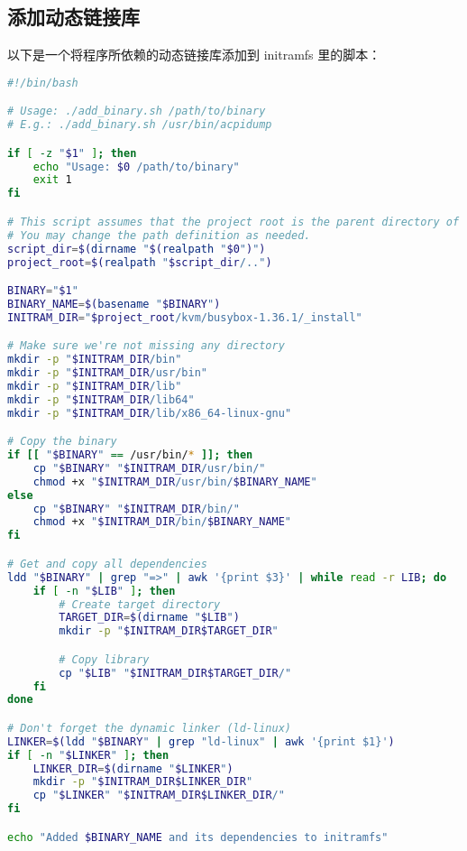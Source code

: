 \subsection{添加动态链接库}\label{appendix:dynamic-library}
以下是一个将程序所依赖的动态链接库添加到 initramfs 里的脚本：
\begin{lstlisting}[language=bash]
#!/bin/bash

# Usage: ./add_binary.sh /path/to/binary
# E.g.: ./add_binary.sh /usr/bin/acpidump

if [ -z "$1" ]; then
	echo "Usage: $0 /path/to/binary"
	exit 1
fi

# This script assumes that the project root is the parent directory of the script.
# You may change the path definition as needed.
script_dir=$(dirname "$(realpath "$0")")
project_root=$(realpath "$script_dir/..")

BINARY="$1"
BINARY_NAME=$(basename "$BINARY")
INITRAM_DIR="$project_root/kvm/busybox-1.36.1/_install"

# Make sure we're not missing any directory
mkdir -p "$INITRAM_DIR/bin"
mkdir -p "$INITRAM_DIR/usr/bin"
mkdir -p "$INITRAM_DIR/lib"
mkdir -p "$INITRAM_DIR/lib64"
mkdir -p "$INITRAM_DIR/lib/x86_64-linux-gnu"

# Copy the binary
if [[ "$BINARY" == /usr/bin/* ]]; then
	cp "$BINARY" "$INITRAM_DIR/usr/bin/"
	chmod +x "$INITRAM_DIR/usr/bin/$BINARY_NAME"
else
	cp "$BINARY" "$INITRAM_DIR/bin/"
	chmod +x "$INITRAM_DIR/bin/$BINARY_NAME"
fi

# Get and copy all dependencies
ldd "$BINARY" | grep "=>" | awk '{print $3}' | while read -r LIB; do
	if [ -n "$LIB" ]; then
		# Create target directory
		TARGET_DIR=$(dirname "$LIB")
		mkdir -p "$INITRAM_DIR$TARGET_DIR"

		# Copy library
		cp "$LIB" "$INITRAM_DIR$TARGET_DIR/"
	fi
done

# Don't forget the dynamic linker (ld-linux)
LINKER=$(ldd "$BINARY" | grep "ld-linux" | awk '{print $1}')
if [ -n "$LINKER" ]; then
	LINKER_DIR=$(dirname "$LINKER")
	mkdir -p "$INITRAM_DIR$LINKER_DIR"
	cp "$LINKER" "$INITRAM_DIR$LINKER_DIR/"
fi

echo "Added $BINARY_NAME and its dependencies to initramfs"
\end{lstlisting}